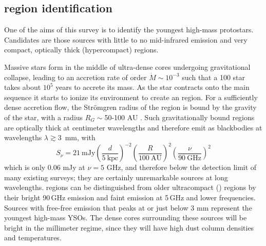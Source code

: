 \documentclass[twocolumn]{aastex62}
\begin{document}


\subsection{\hchii region identification}
\label{sec:hiireg}
One of the aims of this survey is to identify the youngest high-mass
protostars.  Candidates are those sources with little to no mid-infrared emission
and very compact, optically thick (hypercompact) \hii regions.

Massive stars form in the middle of ultra-dense cores undergoing gravitational
collapse, leading to an accretion rate of order $\dot{M} \sim 10^{-3}$ \msun
\peryr such that a 100 \msun star takes about $10^5$ years to accrete its mass.
As the star contracts onto the main sequence it starts to ionize its
environment to create an \hchii region.  For a sufficiently dense accretion
flow, the Str{\"o}mgren radius of the \hchii region is bound by the gravity of
the star, with a radius $R_G \sim$50-100 AU
\citep{Keto2002a,Keto2003a,Keto2007a}.  Such gravitationally bound \hchii
regions are optically thick at centimeter wavelengths and therefore emit as
blackbodies at wavelengths $\lambda\gtrsim$3~mm, with 
\begin{equation}
    S_\nu=21~\textrm{mJy} \left(\frac{d}{5~\textrm{kpc}}\right)^{-2} \left(\frac{R}{100~\textrm{AU}}\right)^2 \left(\frac{\nu}{90~\textrm{GHz}}\right)^2
\end{equation}
which is only
0.06 mJy at $\nu=5$ GHz, and therefore below the detection limit of many
existing surveys; they are certainly unremarkable sources at long wavelengths.
\hchii regions can be distinguished from older
ultracompact (\uchii) regions by their  bright 90\,GHz emission and faint emission at 5\,GHz and lower
frequencies.  Sources
with free-free emission that peaks at or just below 3 mm represent the youngest
high-mass YSOs.  The dense cores surrounding these sources will be bright
in the millimeter regime, since they will have high dust column densities and
temperatures.
\end{document}
